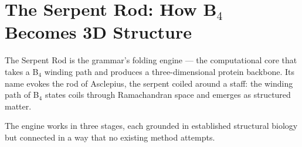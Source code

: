 \documentclass[11pt,a4paper,twocolumn]{article}
\begin{document}
\begin{table}[h]
\centering
\caption{Gene-to-Protein Pipeline: Primitive Values by Stage}
\label{tab:pipeline}
\footnotesize
{}
\end{table}

\section{The Serpent Rod: How B$_4$ Becomes 3D Structure}

The Serpent Rod is the grammar's folding engine — the computational core that takes a B$_4$ winding path and produces a three-dimensional protein backbone. Its name evokes the rod of Asclepius, the serpent coiled around a staff: the winding path of B$_4$ states coils through Ramachandran space and emerges as structured matter.

The engine works in three stages, each grounded in established structural biology but connected in a way that no existing method attempts.
\end{document}
